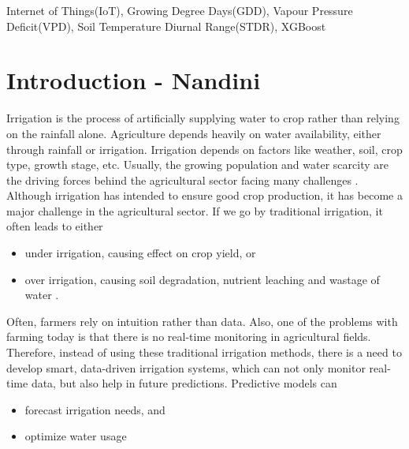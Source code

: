 \documentclass[conference]{IEEEtran}
\begin{document}
\begin{IEEEkeywords}
Internet of Things(IoT), Growing Degree Days(GDD), Vapour Pressure Deficit(VPD), Soil Temperature Diurnal Range(STDR), XGBoost
\end{IEEEkeywords}

\section{Introduction - Nandini} 

Irrigation is the process of artificially supplying water to crop \cite{iioo} rather than relying on the rainfall alone. Agriculture depends heavily on water availability, either through rainfall or irrigation. Irrigation depends on factors like weather, soil, crop type, growth stage, etc. Usually, the growing population and water scarcity are the driving forces behind the agricultural sector facing many challenges \cite{BWAMBALE2022107324}. Although irrigation has intended to ensure good crop production, it has become a major challenge in the agricultural sector. If we go by traditional irrigation, it often leads to either
\begin{itemize}
    \item under irrigation, causing effect on crop yield, or
    \item over irrigation, causing soil degradation, nutrient leaching and wastage of water \cite{bctemp}.
\end{itemize}
Often, farmers rely on intuition rather than data. Also, one of the problems with farming today is that there is no real-time monitoring in agricultural fields. \\ 
Therefore, instead of using these traditional irrigation methods, there is a need to develop smart, data-driven irrigation systems, which can not only monitor real-time data, but also help in future predictions. Predictive models can 
\begin{itemize}
    \item forecast irrigation needs, and
    \item optimize water usage
\end{itemize}
\end{document}
